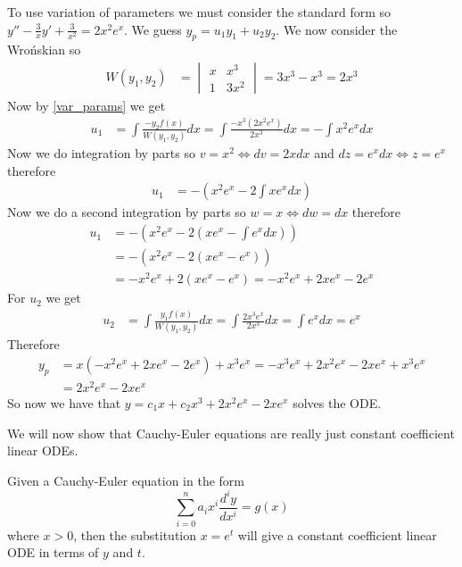 \documentclass[notes]{subfiles}
\begin{document}
\begin{solution}
    To use variation of parameters we must consider the standard form so $y'' - \frac{3}{x}y' + \frac{3}{x^2} = 2x^2e^x$. We guess $y_p = u_1y_1 + u_2y_2$. We now consider the Wro\'nskian so
    \begin{align*}
        W(y_1, y_2)
        &= \begin{vmatrix}
            x & x^3 \\
            1 & 3x^2
        \end{vmatrix}
        = 3x^3 - x^3 = 2x^3
    \end{align*}
    Now by \cref{var_params} we get
    \begin{align*}
        u_1
        &= \int \frac{-y_2f(x)}{W(y_1, y_2)} dx
        = \int \frac{-x^3(2x^2 e^x)}{2x^3} dx
        = -\int x^2e^x dx
    \end{align*}
    Now we do integration by parts so $v = x^2 \iff dv = 2xdx$ and $dz = e^xdx \iff z = e^x$ therefore
    \begin{align*}
        u_1
        &= -\left( x^2e^x - 2\int xe^x dx \right)
    \end{align*}
    Now we do a second integration by parts so $w = x \iff dw = dx$ therefore
    \begin{align*}
        u_1
        &= -\left( x^2e^x - 2\left( xe^x - \int e^x dx \right) \right) \\
        &= -\left( x^2e^x - 2\left( xe^x - e^x \right) \right) \\
        &= -x^2e^x + 2\left( xe^x - e^x \right)
        = -x^2e^x + 2xe^x - 2e^x
    \end{align*}
    For $u_2$ we get
    \begin{align*}
        u_2
        &= \int \frac{y_1f(x)}{W(y_1, y_2)} dx
        = \int \frac{2x^3e^x}{2x^3} dx
        = \int e^x dx
        = e^x
    \end{align*}
    Therefore
    \begin{align*}
        y_p
        &= x(-x^2e^x + 2xe^x - 2e^x) + x^3e^x
        = -x^3e^x + 2x^2e^x - 2xe^x + x^3e^x \\
        &= 2x^2e^x - 2xe^x
    \end{align*}
    So now we have that $y = c_1x + c_2x^3 + 2x^2e^x - 2xe^x$ solves the ODE.
\end{solution}

We will now show that Cauchy-Euler equations are really just constant coefficient linear ODEs.

\begin{theorem}
    Given a Cauchy-Euler equation in the form
    \[
        \sum_{i = 0}^n a_i x^i \frac{d^iy}{dx^i} = g(x)
    \]
    where $x > 0$, then the substitution $x = e^t$ will give a constant coefficient linear ODE in terms of $y$ and $t$.
\end{theorem}
\end{document}
